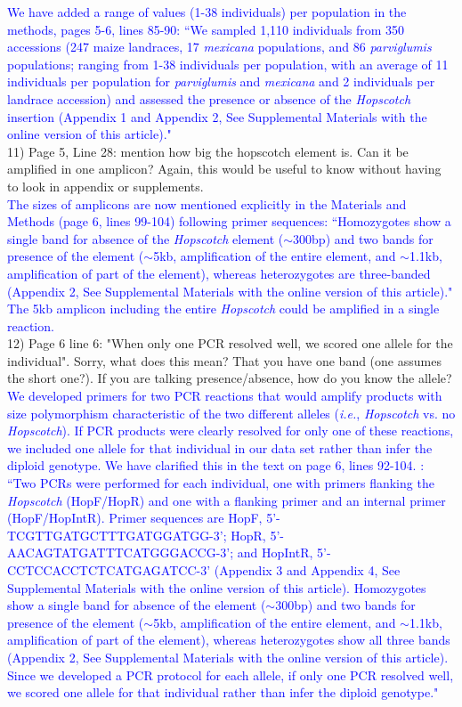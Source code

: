\documentclass[11pt]{article}
\newcommand{\res}[1]{\noindent \textcolor{blue}{{#1}} \\}
\begin{document}
\res{We have added a range of values (1-38 individuals) per population in the methods, pages 5-6, lines 85-90: ``We sampled 1,110 individuals from 350 accessions (247 maize landraces, 17 \emph{mexicana} populations, and 86 \emph{parviglumis} populations; ranging from 1-38 individuals per population, with an average of 11 individuals per population for \emph{parviglumis} and \emph{mexicana} and 2 individuals per landrace accession) and assessed the presence or absence of the \emph{Hopscotch} insertion (Appendix 1 and Appendix 2, See Supplemental Materials with the online version of this article)."}

11) Page 5, Line 28: mention how big the hopscotch element is.  Can it be amplified in one amplicon? Again, this would be useful to know without having to look in appendix or supplements.\\

\res{The sizes of amplicons are now mentioned explicitly in the Materials and Methods (page 6, lines 99-104) following primer sequences: 
``Homozygotes show a single band for absence of the \emph{Hopscotch} element ($\sim$300bp) and two bands for presence of the element ($\sim$5kb, amplification of the entire element, and $\sim$1.1kb, amplification of part of the element), whereas heterozygotes are three-banded (Appendix 2, See Supplemental Materials with the online version of this article)."
The 5kb amplicon including the entire \emph{Hopscotch} could be amplified in a single reaction.}

12) Page 6 line 6: "When only one PCR resolved well, we scored one allele for the individual".  Sorry, what does this mean? That you have one band (one assumes the short one?). If you are talking presence/absence, how do you know the allele?\\ 

\res{We developed primers for two PCR reactions that would amplify products with size polymorphism characteristic of the two different alleles (\emph{i.e.}, \emph{Hopscotch} vs. no \emph{Hopscotch}). If PCR products were clearly resolved for only one of these reactions, we included one allele for that individual in our data set rather than infer the diploid genotype. We have clarified this in the text on page 6, lines 92-104. : ``Two PCRs were performed for each individual, one with primers flanking the \emph{Hopscotch} (HopF/HopR) and one with a flanking primer and an internal primer (HopF/HopIntR). Primer sequences are HopF, {\small 5'-TCGTTGATGCTTTGATGGATGG-3'}; 
HopR, {\small 5'-AACAGTATGATTTCATGGGACCG-3'}; and HopIntR, {\small  5'-CCTCCACCTCTCATGAGATCC-3'} (Appendix 3 and Appendix 4, See Supplemental Materials with the online version of this article). Homozygotes show a single band for absence of the element ($\sim$300bp) and two bands for presence of the element ($\sim$5kb, amplification of the entire element, and $\sim$1.1kb, amplification of part of the element), whereas heterozygotes show all three bands (Appendix 2, See Supplemental Materials with the online version of this article). Since we developed a PCR protocol for each allele, if only one PCR resolved well, we scored one allele for that individual rather than infer the diploid genotype."}
\end{document}
